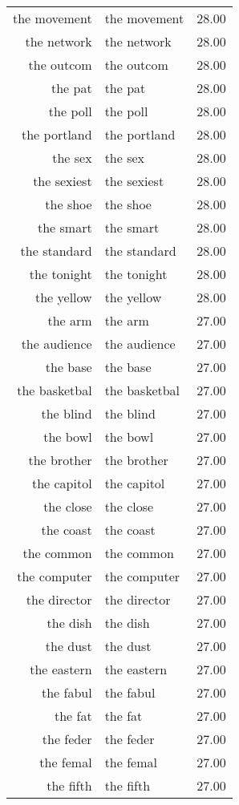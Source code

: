 \begin{table}[ht]
\begin{tabular}{rlr}
  the movement & the movement & 28.00 \\ 
  the network & the network & 28.00 \\ 
  the outcom & the outcom & 28.00 \\ 
  the pat & the pat & 28.00 \\ 
  the poll & the poll & 28.00 \\ 
  the portland & the portland & 28.00 \\ 
  the sex & the sex & 28.00 \\ 
  the sexiest & the sexiest & 28.00 \\ 
  the shoe & the shoe & 28.00 \\ 
  the smart & the smart & 28.00 \\ 
  the standard & the standard & 28.00 \\ 
  the tonight & the tonight & 28.00 \\ 
  the yellow & the yellow & 28.00 \\ 
  the arm & the arm & 27.00 \\ 
  the audience & the audience & 27.00 \\ 
  the base & the base & 27.00 \\ 
  the basketbal & the basketbal & 27.00 \\ 
  the blind & the blind & 27.00 \\ 
  the bowl & the bowl & 27.00 \\ 
  the brother & the brother & 27.00 \\ 
  the capitol & the capitol & 27.00 \\ 
  the close & the close & 27.00 \\ 
  the coast & the coast & 27.00 \\ 
  the common & the common & 27.00 \\ 
  the computer & the computer & 27.00 \\ 
  the director & the director & 27.00 \\ 
  the dish & the dish & 27.00 \\ 
  the dust & the dust & 27.00 \\ 
  the eastern & the eastern & 27.00 \\ 
  the fabul & the fabul & 27.00 \\ 
  the fat & the fat & 27.00 \\ 
  the feder & the feder & 27.00 \\ 
  the femal & the femal & 27.00 \\ 
  the fifth & the fifth & 27.00 \\ 

\end{tabular}
\end{table}
